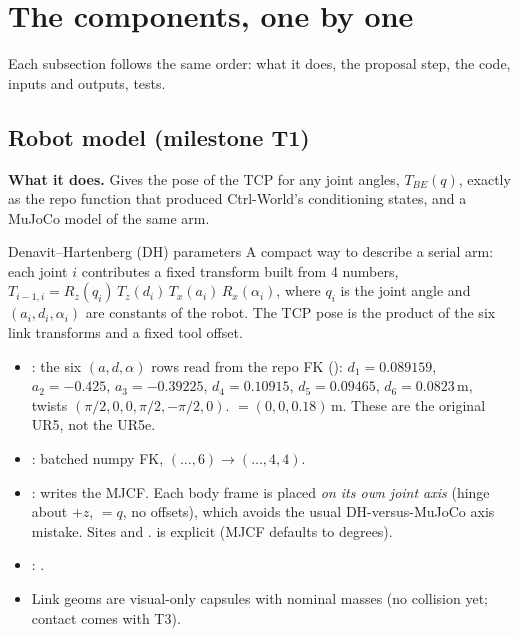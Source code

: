 \section{The components, one by one}\label{twin:sec:components}
Each subsection follows the same order: what it does, the proposal step, the code, inputs and outputs, tests.

\subsection{Robot model (milestone T1) \done}\label{twin:sec:robot}
\textbf{What it does.} Gives the pose of the TCP for any joint angles, $T_{BE}(q)$, exactly as the repo function that produced Ctrl-World's conditioning states, and a MuJoCo model of the same arm.

\begin{newc}{Denavit--Hartenberg (DH) parameters}
A compact way to describe a serial arm: each joint $i$ contributes a fixed transform built from 4 numbers, $T_{i-1,i}=R_z(q_i)\,T_z(d_i)\,T_x(a_i)\,R_x(\alpha_i)$, where $q_i$ is the joint angle and $(a_i,d_i,\alpha_i)$ are constants of the robot. The TCP pose is the product of the six link transforms and a fixed tool offset.
\end{newc}

\begin{incode}
\begin{itemize}[leftmargin=*]
\item {}: the six $(a,d,\alpha)$ rows read from the repo FK (): $d_1=0.089159$, $a_2=-0.425$, $a_3=-0.39225$, $d_4=0.10915$, $d_5=0.09465$, $d_6=0.0823$\,m, twists $(\pi/2,0,0,\pi/2,-\pi/2,0)$.  $=(0,0,0.18)$\,m. These are the original UR5, not the UR5e.
\item {}: batched numpy FK, $(\ldots,6)\to(\ldots,4,4)$.
\item {}: writes the MJCF. Each body frame is placed \emph{on its own joint axis} (hinge about $+z$,  $=q$, no offsets), which avoids the usual DH-versus-MuJoCo axis mistake. Sites  and .  is explicit (MJCF defaults to degrees).
\item {}: .
\item Link geoms are visual-only capsules with nominal masses (no collision yet; contact comes with T3).
\end{itemize}
\end{incode}

